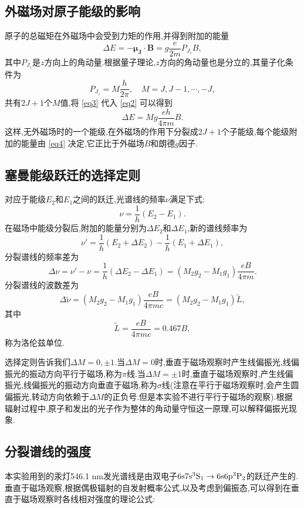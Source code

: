 \documentclass[font=default]{mpltx}
\begin{document}
\subsection{外磁场对原子能级的影响}
原子的总磁矩在外磁场中会受到力矩的作用,并得到附加的能量
\begin{equation}\label{eq2}
    \Delta E=-\bm{\mu_J}\cdot\bm{B}=g\frac{e}{2m}P_{J_z}B,
\end{equation}
其中$P_{J_z}$是$z$方向上的角动量.根据量子理论,$z$方向的角动量也是分立的,其量子化条件为
\begin{equation}
    P_{J_z}=M\frac{h}{2\pi},\quad M=J,J-1,\cdots,-J,\label{eq3}
\end{equation}
共有$2J+1$个$M$值,将 \autoref{eq3} 代入 \autoref{eq2} 可以得到
\begin{equation}\label{eq4}
    \Delta E=Mg\frac{eh}{4\pi m}B.
\end{equation}这样,无外磁场时的一个能级,在外磁场的作用下分裂成$2J+1$个子能级,每个能级附加的能量由 \autoref{eq4} 决定,它正比于外磁场$B$和朗德$g$因子.
\subsection{塞曼能级跃迁的选择定则}
对应于能级$E_2$和$E_1$之间的跃迁,光谱线的频率$\nu$满足下式:$$\nu=\frac{1}{h}(E_2-E_1).$$在磁场中能级分裂后,附加的能量分别为$\Delta E_2$和$\Delta E_1$,新的谱线频率为$$\nu'=\frac{1}{h}(E_2+\Delta E_2)-\frac{1}{h}(E_1+\Delta E_1),$$分裂谱线的频率差为$$\Delta\nu=\nu'-\nu=\frac{1}{h}(\Delta E_2-\Delta E_1)=(M_2g_2-M_1g_1)\frac{eB}{4\pi m}.$$分裂谱线的波数差为
\begin{equation}\label{eq5}
  \Delta\widetilde{\nu}=(M_2g_2-M_1g_1)\frac{eB}{4\pi mc}=(M_2g_2-M_1g_1)\widetilde{L},
\end{equation}其中
\begin{equation}\label{eq6}\widetilde{L}=\frac{eB}{4\pi mc}=0.467B,
\end{equation}称为洛伦兹单位.

选择定则告诉我们$\Delta M=0,\pm 1$.当$\Delta M=0$时,垂直于磁场观察时产生线偏振光,线偏振光的振动方向平行于磁场,称为$\pi$线.当$\Delta M=\pm 1$时,垂直于磁场观察时,产生线偏振光,线偏振光的振动方向垂直于磁场,称为$\sigma$线(注意在平行于磁场观察时,会产生圆偏振光,转动方向依赖于$\Delta M$的正负号.但是本实验不进行平行于磁场的观察).根据辐射过程中,原子和发出的光子作为整体的角动量守恒这一原理,可以解释偏振光现象.
\subsection{分裂谱线的强度}
本实验用到的汞灯546.1 nm发光谱线是由双电子${\rm 6s7s^3S_1\to 6s6p^3P_2}$的跃迁产生的.
垂直于磁场观察,根据偶极辐射的自发射概率公式,以及考虑到偏振态,可以得到在垂直于磁场观察时各线相对强度的理论公式:
\end{document}
